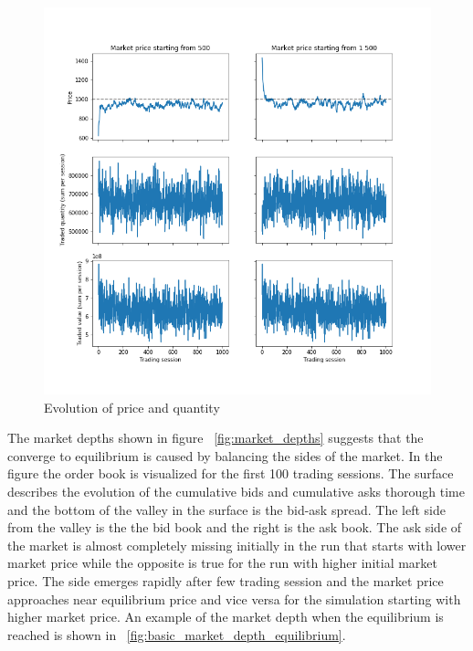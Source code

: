 \begin{figure}
    \includegraphics[width=\linewidth]{plots/basic_trades.png}
    \caption{Evolution of price and quantity}
    \label{fig:basic_trades}
\end{figure}

The market depths shown in figure ~\ref{fig:market_depths} suggests that the
converge to equilibrium is caused by balancing the sides of the market. 
In the figure the order book is visualized for the first 100 trading sessions. 
The surface describes the evolution of the cumulative bids and cumulative asks 
thorough time and the bottom of the valley in the surface is the bid-ask spread. 
The left side from the valley is the the bid book and the right is the ask book. The 
ask side of the market is almost completely missing initially in the run that
starts with lower market price while the opposite is true for the run with higher
initial market price. The side emerges rapidly after few trading session
and the market price approaches near equilibrium price and vice versa for the 
simulation starting with higher market price. An example of the market depth 
when the equilibrium is reached is shown in ~\ref{fig:basic_market_depth_equilibrium}.


